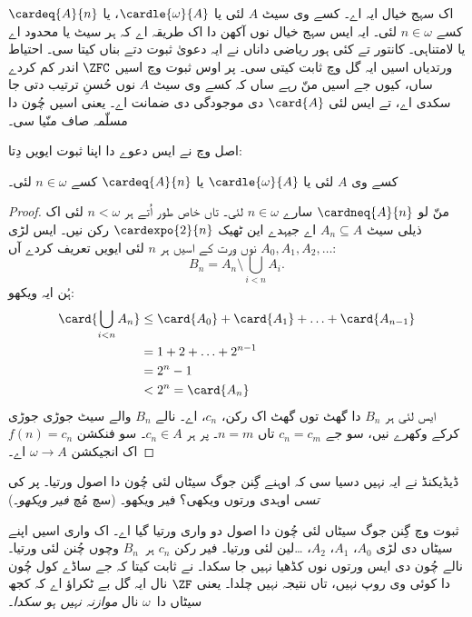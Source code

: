 \documentclass[../../../include/open-logic-section]{subfiles}
\begin{document}
\begin{ex}
اک سہج خیال ایہ اے۔ کسے وی سیٹ $A$ لئی یا $\cardle{\omega}{A}$، یا $\cardeq{A}{n}$ کسے $n \in \omega$ لئی۔ ایہ ایس سہج خیال نوں آکھن دا اک طریقہ اے کہ ہر سیٹ یا محدود اے یا لامتناہی۔ کانتور تے کئی ہور ریاضی داناں نے ایہ دعویٰ ثبوت دتے بناں کیتا سی۔ احتیاط ورتدیاں اسیں ایہ گل  وچ ثابت کیتی سی۔ پر اوس ثبوت وچ اسیں $\ZFC$ اندر کم کردے ساں، کیوں جے اسیں منّ رہے ساں کہ کسے وی سیٹ $A$ نوں حُسنِ ترتیب دتی جا سکدی اے، تے ایس لئی $\card{A}$ دی موجودگی دی ضمانت اے۔ یعنی اسیں چُون دا مسلّمہ صاف منّیا سی۔

اصل وچ \citet{Dedekind1888} نے ایس دعوے دا اپنا ثبوت ایویں دِتا:

\begin{thm}
کسے وی $A$ لئی یا $\cardle{\omega}{A}$ یا $\cardeq{A}{n}$ کسے $n \in \omega$ لئی۔
\end{thm}

\begin{proof}
منّ لو $\cardneq{A}{n}$ سارے $n \in \omega$ لئی۔ تاں خاص طور اُتے ہر $n < \omega$ لئی اک ذیلی سیٹ $A_n \subseteq A$ اے جیہدے این ٹھیک $\cardexpo{2}{n}$ رکن نیں۔ ایس لڑی $A_0, A_1, A_2,
\ldots$ نوں ورت کے اسیں ہر $n$ لئی ایویں تعریف کردے آں:
\[
	B_n = A_n \setminus \bigcup_{i < n} A_i.
\]
ہُن ایہ ویکھو:
\begin{align*}
	\card{\bigcup_{i < n}A_n}
	&\leq \card{A_0} + \card{A_1} + \ldots + \card{A_{n-1}}\\
	&=1 + 2 + \ldots + 2^{n-1}\\
	& = 2^n - 1\\
	& < 2^n = \card{A_n}
\end{align*}
ایس لئی ہر $B_n$ دا گھٹ توں گھٹ اک رکن، $c_n$، اے۔ نالے $B_n$ والے سیٹ جوڑی جوڑی کرکے وکھرے نیں، سو جے $c_n = c_m$ تاں $n = m$۔ پر ہر $c_n
\in A$۔ سو فنکشن $f(n) = c_n$ اک انجیکشن $\omega \to A$ اے۔
\end{proof}
\noindent
ڈیڈیکنڈ نے ایہ نہیں دسیا سی کہ اوہنے گِنن جوگ سیٹاں لئی چُون دا اصول ورتیا۔ پر کی \emph{تسی} اوہدی ورتوں ویکھی؟ فیر ویکھو۔ (سچ مُچ \emph{فیر ویکھو}۔)

ثبوت وچ گِنن جوگ سیٹاں لئی چُون دا اصول دو واری ورتیا گیا اے۔ اک واری اسیں اپنے سیٹاں دی لڑی $A_0$، $A_1$، $A_2$، \dots\@ لین لئی ورتیا۔ فیر رکن $c_n$ ہر~$B_n$ وچوں چُنن لئی ورتیا۔ نالے چُون دی ایس ورتوں نوں کڈھیا نہیں جا سکدا۔ \citet[p.~138]{Cohen1966} نے ثابت کیتا کہ جے ساڈے کول چُون دا کوئی وی روپ نہیں، تاں نتیجہ نہیں چلدا۔ یعنی $\ZF$ نال ایہ گل بے ٹکراؤ اے کہ کجھ سیٹاں دا~$\omega$ نال \emph{موازنہ نہیں ہو سکدا}۔
\end{ex}
\end{document}
